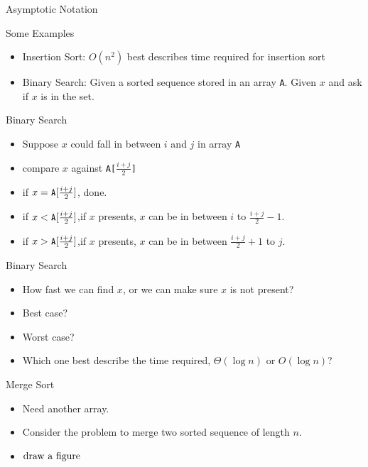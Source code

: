 \documentclass{beamer}
\begin{document}
\begin{frame}{}
\begin{center}
{\large Asymptotic Notation}

{Some Examples}
\end{center}
\begin{itemize}
  \item Insertion Sort: $O(n^2)$ best describes time required for 
    insertion sort
  \item Binary Search: Given a sorted sequence stored in an array {\tt A}. 
    Given $x$ and ask if $x$ is in the set.  
\end{itemize}
\end{frame}

\begin{frame}{}
\begin{center}
{Binary Search}
\end{center}
\begin{itemize}
\item Suppose $x$ could fall in between $i$ and $j$ in array {\tt A}
\item compare $x$ against {\tt A[}$\frac{i+j}{2}${\tt ]}
\item if $x={\tt A}[\frac{i+j}{2}]$, done.
\item if $x<{\tt A}[\frac{i+j}{2}]$,if $x$ presents, $x$ can be in 
  between $i$ to $\frac{i+j}{2}-1$.
\item if $x>{\tt A}[\frac{i+j}{2}]$,if $x$ presents, $x$ can be in 
  between $\frac{i+j}{2}+1$ to $j$.
\end{itemize}
\end{frame}

\begin{frame}{}
\begin{center}
Binary Search
\end{center}
\begin{itemize}
\item How fast we can find $x$, or we can make sure $x$ is not present?
\item Best case?
\item Worst case?
\item Which one best describe the time required, $\Theta(\log n)$ or
  $O(\log n)$?
\end{itemize}
\end{frame}

\begin{frame}{}
\begin{center}
{\large Merge Sort}
\end{center}
\begin{itemize}
\item Need another array.
\item Consider the problem to merge two sorted sequence of length $n$.  
\item ${\rm draw\ a\ figure}$
\end{itemize}
%
\end{frame}
\end{document}
